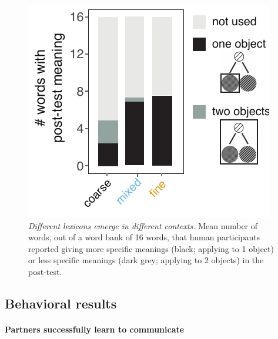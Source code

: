
\begin{figure}[t]
\begin{center}
\includegraphics[scale=1]{./figures/Exp2_postTest}
\caption{\emph{Different lexicons emerge in different contexts.} Mean number of words, out of a word bank of 16 words, that human participants reported giving more specific meanings (black; applying to 1 object) or less specific meanings (dark grey; applying to 2 objects) in the post-test.}
\label{fig:sec2postTest}
\end{center}
\end{figure}


\subsection{Behavioral results}

\paragraph{Partners successfully learn to communicate}


